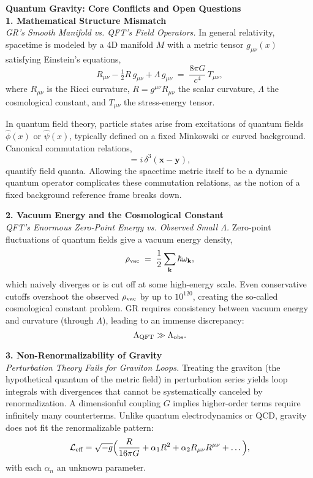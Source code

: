 
\begin{technical}
    {\Large\textbf{Quantum Gravity: Core Conflicts and Open Questions}}\\[0.7em]

    \noindent\textbf{1. Mathematical Structure Mismatch}\\[0.5em]
    \textit{GR's Smooth Manifold vs. QFT's Field Operators.}
    In general relativity, spacetime is modeled by a 4D manifold $M$ with a metric tensor $g_{\mu\nu}(x)$ satisfying Einstein’s equations,
    \begin{equation}
        R_{\mu\nu} - \tfrac{1}{2}R\,g_{\mu\nu} + \Lambda\,g_{\mu\nu} \;=\; \frac{8\pi G}{c^4}\,T_{\mu\nu},
    \end{equation}
    where $R_{\mu\nu}$ is the Ricci curvature, $R = g^{\mu\nu}R_{\mu\nu}$ the scalar curvature, $\Lambda$ the cosmological constant, and $T_{\mu\nu}$ the stress-energy tensor. 

    In quantum field theory, particle states arise from excitations of quantum fields $\hat{\phi}(x)$ or $\hat{\psi}(x)$, typically defined on a fixed Minkowski or curved background. Canonical commutation relations,
    \begin{equation}
        [\hat{\phi}(t,\mathbf{x}),\,\hat{\pi}(t,\mathbf{y})] = i\,\delta^3(\mathbf{x}-\mathbf{y}),
    \end{equation}
    quantify field quanta. Allowing the spacetime metric itself to be a dynamic quantum operator complicates these commutation relations, as the notion of a fixed background reference frame breaks down.

    \noindent\textbf{2. Vacuum Energy and the Cosmological Constant}\\[0.5em]
    \textit{QFT's Enormous Zero-Point Energy vs. Observed Small $\Lambda$.}
    Zero-point fluctuations of quantum fields give a vacuum energy density,
    \begin{equation}
        \rho_{\rm vac} \;=\; \frac{1}{2}\sum_{\mathbf{k}}\hbar\omega_{\mathbf{k}},
    \end{equation}
    which naively diverges or is cut off at some high-energy scale. Even conservative cutoffs overshoot the observed $\rho_{\rm vac}$ by up to $10^{120}$, creating the so-called cosmological constant problem. GR requires consistency between vacuum energy and curvature (through $\Lambda$), leading to an immense discrepancy:
    \[
        \Lambda_{\rm QFT} \gg \Lambda_{\rm obs}.
    \]

    \noindent\textbf{3. Non-Renormalizability of Gravity}\\[0.5em]
    \textit{Perturbation Theory Fails for Graviton Loops.}
    Treating the graviton (the hypothetical quantum of the metric field) in perturbation series yields loop integrals with divergences that cannot be systematically canceled by renormalization. A dimensionful coupling $G$ implies higher-order terms require infinitely many counterterms. Unlike quantum electrodynamics or QCD, gravity does not fit the renormalizable pattern:
    \[
        \mathcal{L}_\text{eff} = \sqrt{-g}\Bigl(\frac{R}{16\pi G} + \alpha_1 R^2 + \alpha_2 R_{\mu\nu}R^{\mu\nu} + \dots\Bigr),
    \]
    with each $\alpha_n$ an unknown parameter.


\end{technical}
